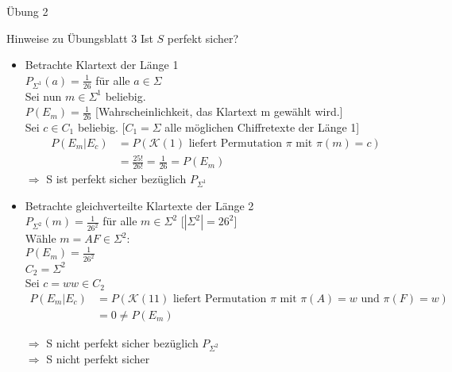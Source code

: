 \begin{section}{Übung 2}
\begin{subsection}{Hinweise zu Übungsblatt 3}
  Ist $S$ perfekt sicher? \\
  \begin{itemize}
   \item Betrachte Klartext der Länge 1 \\
   $P_{\Sigma^1}(a) = \frac{1}{26}$ für alle $a \in \Sigma$\\
   Sei nun $m \in \Sigma^1$ beliebig. \\
   $P(E_m) = \frac{1}{26}$ [Wahrscheinlichkeit, das Klartext m gewählt wird.] \\
   Sei $c \in C_1$ beliebig. [$C_1 = \Sigma$ alle möglichen Chiffretexte der Länge 1]
   \begin{align*}
      P(E_m|E_c) &= P(\mathcal{K}(1) \text{ liefert Permutation }\pi\text{ mit } \pi(m) = c)\\
      &= \frac{25!}{26!} = \frac{1}{26} = P(E_m)
   \end{align*}
   $\Rightarrow$ S ist perfekt sicher bezüglich $P_{\Sigma^1}$
   \item Betrachte gleichverteilte Klartexte der Länge 2 \\
   $P_{\Sigma^2}(m) = \frac{1}{26^2}$ für alle $m \in \Sigma^2$ [$|\Sigma^2| = 26^2$]\\
   Wähle $m=AF \in \Sigma^2$: \\
   $P(E_m) = \frac{1}{26^2}$ \\
   $C_2 = \Sigma^2$ \\
   Sei $c = ww \in C_2$
   \begin{align*}
    P(E_m|E_c) &= P(\mathcal{K}(11) \text{ liefert Permutation }\pi\text{ mit }\pi(A)=w\text{ und }\pi(F)=w)\\
    &= 0 \neq P(E_m) 
   \end{align*}

   
   
   $\Rightarrow$ S nicht perfekt sicher bezüglich $P_{\Sigma^2}$\\
   $\Rightarrow$ S nicht perfekt sicher

   
   
  \end{itemize}


  
  
  
 \end{subsection}


\end{section}
